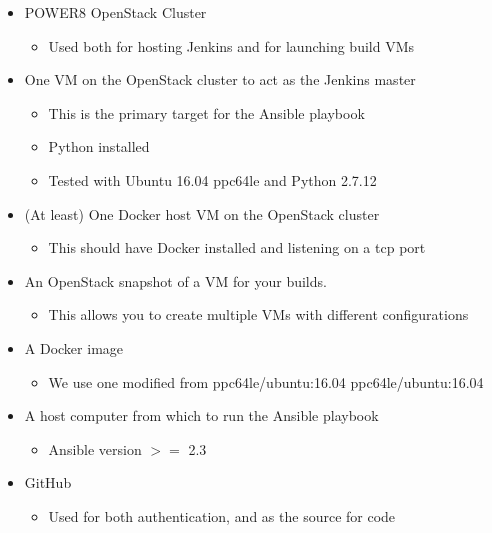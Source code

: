 \documentclass[10pt,letterpaper,onecolumn,draftclsnofoot]{IEEEtran}
\begin{document}
\begin{itemize}
  \item POWER8 OpenStack Cluster
    \begin{itemize}
       \item Used both for hosting Jenkins and for launching build VMs
    \end{itemize}
      \item One VM on the OpenStack cluster to act as the Jenkins master

    \begin{itemize}
        \item  This is the primary target for the Ansible playbook
        \item  Python installed
        \item  Tested with Ubuntu 16.04 ppc64le and Python 2.7.12
    \end{itemize}
      \item    (At least) One Docker host VM on the OpenStack cluster
    \begin{itemize}
      \item  This should have Docker installed and listening on a tcp port
    \end{itemize}
      \item    An OpenStack snapshot of a VM for your builds.
    \begin{itemize}
        \item This allows you to create multiple VMs with different configurations
    \end{itemize}
      \item    A Docker image
    \begin{itemize}
        \item We use one modified from ppc64le/ubuntu:16.04 ppc64le/ubuntu:16.04
    \end{itemize}
      \item    A host computer from which to run the Ansible playbook
    \begin{itemize}
       \item Ansible version $>=$ 2.3
    \end{itemize}
      \item    GitHub 
    \begin{itemize}
       \item Used for both authentication, and as the source for code
    \end{itemize}
\end{itemize}
\end{document}
